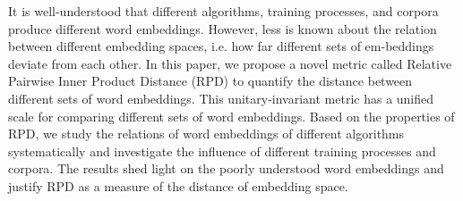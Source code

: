 It is well-understood that different algorithms, training processes, and corpora produce different word embeddings. However, less is known about the relation between different embedding spaces,  i.e. how far different sets of em-beddings deviate from each other.  In this paper,  we propose a  novel metric called  Relative Pairwise Inner Product Distance (RPD) to quantify the distance between different sets of word embeddings.  This unitary-invariant metric has a unified scale for comparing different sets of word embeddings.  Based on the properties of RPD, we study the relations of word embeddings of different algorithms systematically and investigate the influence of different training processes and corpora. The results shed light on the poorly understood word embeddings and justify RPD as a measure of the distance of embedding space.
